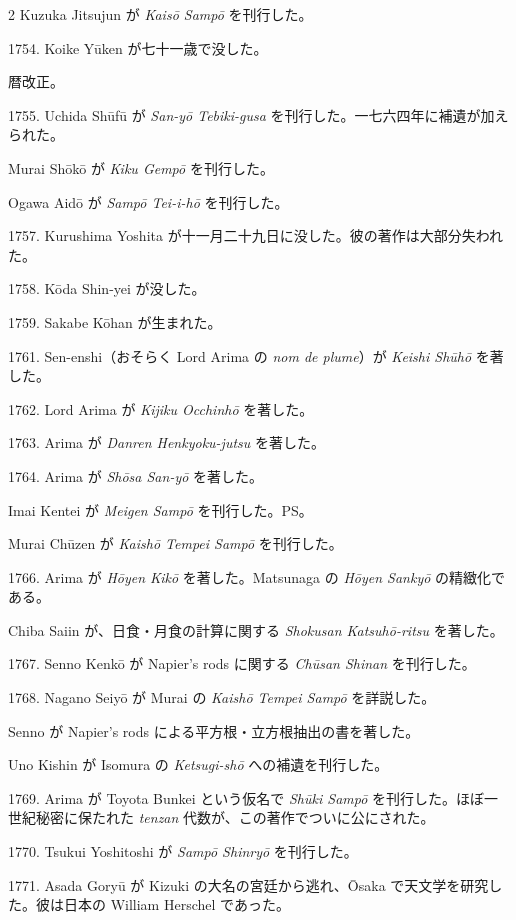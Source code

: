 \documentclass[11pt]{article}
\newcommand{\scanpage}[2]{\clearpage\setcounter{footnote}{0}\noindent{\footnotesize\color{gray}PDF #1 頁 · #2}\par\medskip}
\begin{document}
\scanpage{0198}{第23章年表、印刷頁184}
\begin{multicols}{2}\small
Kuzuka Jitsujun が \emph{Kaisō Sampō} を刊行した。

1754. Koike Yūken が七十一歳で没した。

暦改正。

1755. Uchida Shūfū が \emph{San-yō Tebiki-gusa} を刊行した。一七六四年に補遺が加えられた。

Murai Shōkō が \emph{Kiku Gempō} を刊行した。

Ogawa Aidō が \emph{Sampō Tei-i-hō} を刊行した。

1757. Kurushima Yoshita が十一月二十九日に没した。彼の著作は大部分失われた。

1758. Kōda Shin-yei が没した。

1759. Sakabe Kōhan が生まれた。

1761. Sen-enshi（おそらく Lord Arima の \emph{nom de plume}）が \emph{Keishi Shūhō} を著した。

1762. Lord Arima が \emph{Kijiku Occhinhō} を著した。

1763. Arima が \emph{Danren Henkyoku-jutsu} を著した。

1764. Arima が \emph{Shōsa San-yō} を著した。

Imai Kentei が \emph{Meigen Sampō} を刊行した。PS。

Murai Chūzen が \emph{Kaishō Tempei Sampō} を刊行した。

1766. Arima が \emph{Hōyen Kikō} を著した。Matsunaga の \emph{Hōyen Sankyō} の精緻化である。

Chiba Saiin が、日食・月食の計算に関する \emph{Shokusan Katsuhō-ritsu} を著した。

1767. Senno Kenkō が Napier's rods に関する \emph{Chūsan Shinan} を刊行した。

1768. Nagano Seiyō が Murai の \emph{Kaishō Tempei Sampō} を詳説した。

Senno が Napier's rods による平方根・立方根抽出の書を著した。

Uno Kishin が Isomura の \emph{Ketsugi-shō} への補遺を刊行した。

1769. Arima が Toyota Bunkei という仮名で \emph{Shūki Sampō} を刊行した。ほぼ一世紀秘密に保たれた \emph{tenzan} 代数が、この著作でついに公にされた。

1770. Tsukui Yoshitoshi が \emph{Sampō Shinryō} を刊行した。

1771. Asada Goryū が Kizuki の大名の宮廷から逃れ、Ōsaka で天文学を研究した。彼は日本の William Herschel であった。


\end{multicols}
\end{document}
